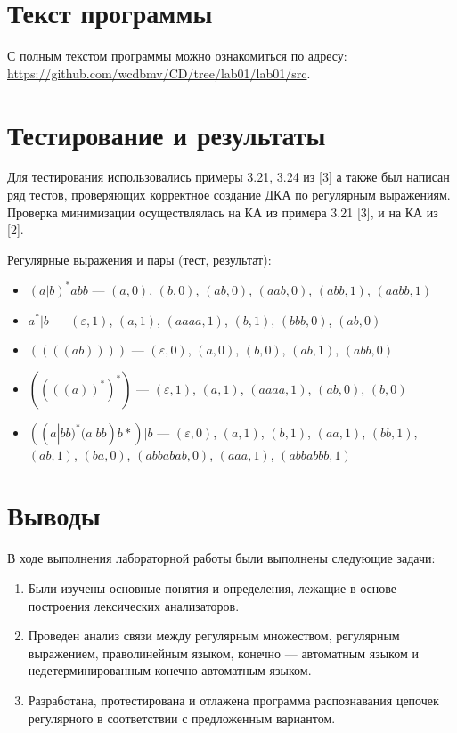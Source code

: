 \documentclass{bmstu-gost-7-32}
\begin{document}
\section*{Текст программы}

С полным текстом программы можно ознакомиться по адресу: \url{https://github.com/wcdbmv/CD/tree/lab01/lab01/src}.

\section*{Тестирование и результаты}

Для тестирования использовались примеры 3.21, 3.24 из [3] а также был написан ряд тестов, проверяющих корректное создание ДКА по регулярным выражениям.
Проверка минимизации осуществлялась на КА из примера 3.21 [3], и на КА из [2].

Регулярные выражения и пары (тест, результат):
\begin{itemize}
	\item $(a|b)^*abb$ — $(a, 0)$, $(b, 0)$, $(ab, 0)$, $(aab, 0)$, $(abb, 1)$, $(aabb, 1)$
	\item $a^*|b$ — $(\varepsilon, 1)$, $(a, 1)$, $(aaaa, 1)$, $(b, 1)$, $(bbb, 0)$, $(ab, 0)$
	\item $((((ab))))$ — $(\varepsilon, 0)$, $(a, 0)$, $(b, 0)$, $(ab, 1)$, $(abb, 0)$
	\item $((((a))^*)^*)$ — $(\varepsilon, 1)$, $(a, 1)$, $(aaaa, 1)$, $(ab, 0)$, $(b, 0)$
	\item $((a|bb)^*(a|bb)b*)|b$ — $(\varepsilon, 0)$, $(a, 1)$, $(b, 1)$, $(aa, 1)$, $(bb, 1)$, $(ab, 1)$, $(ba, 0)$, $(abbabab, 0)$, $(aaa, 1)$, $(abbabbb, 1)$
\end{itemize}

\section*{Выводы}

В ходе выполнения лабораторной работы были выполнены следующие задачи:

\begin{enumerate}
	\item Были изучены основные понятия и определения, лежащие в основе построения лексических анализаторов.
	\item Проведен анализ связи между регулярным множеством, регулярным выражением, праволинейным языком, конечно — автоматным языком и недетерминированным конечно-автоматным языком.
	\item Разработана, протестирована и отлажена программа распознавания цепочек регулярного в соответствии с предложенным вариантом.
\end{enumerate}
\end{document}
